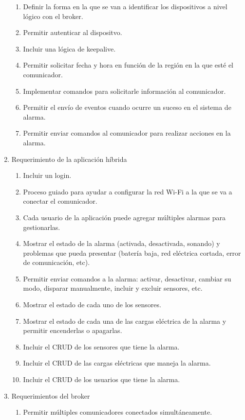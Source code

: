 \documentclass[
11pt, %
]{charter}
\begin{document}
\begin{enumerate}
		\begin{enumerate}
			\item Definir la forma en la que se van a identificar los dispositivos a nivel lógico con el broker.
			\item Permitir autenticar al dispositvo.
			\item Incluir una lógica de keepalive.
			\item Permitir solicitar fecha y hora en función de la región en la que esté el comunicador.
			\item Implementar comandos para solicitarle información al comunicador.
			\item Permitir el envío de eventos cuando ocurre un suceso en el sistema de alarma.
			\item Permitir enviar comandos al comunicador para realizar acciones en la alarma.
		\end{enumerate}
	\item Requerimiento de la aplicación híbrida
		\begin{enumerate}
			\item Incluir un login.
			\item Proceso guiado para ayudar a configurar la red Wi-Fi a la que se va a conectar el comunicador.
			\item Cada usuario de la aplicación puede agregar múltiples alarmas para gestionarlas.
			\item Mostrar el estado de la alarma (activada, desactivada, sonando) y problemas que pueda presentar (batería baja, red eléctrica cortada, error de comunicación, etc).
			\item Permitir enviar comandos a la alarma: activar, desactivar, cambiar su modo, disparar manualmente, incluir y excluir sensores, etc.
			\item Mostrar el estado de cada uno de los sensores.
			\item Mostrar el estado de cada una de las cargas eléctrica de la alarma y permitir encenderlas o apagarlas.
			\item Incluir el CRUD de los sensores que tiene la alarma.
			\item Incluir el CRUD de las cargas eléctricas que maneja la alarma.
			\item Incluir el CRUD de los usuarios que tiene la alarma.
		\end{enumerate}
	\item Requerimientos del broker
		\begin{enumerate}
			\item Permitir múltiples comunicadores conectados simultáneamente.

\end{enumerate}
\end{enumerate}
\end{document}
